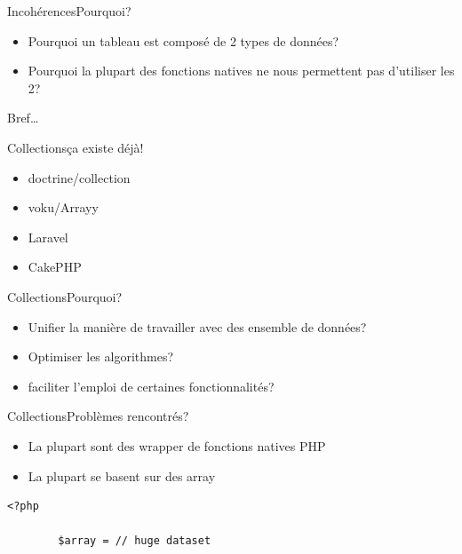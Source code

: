 \begin{frame}{Incohérences}{Pourquoi?}
    \begin{itemize}[<+->]
        \item Pourquoi un tableau est composé de 2 types de données?
        \item Pourquoi la plupart des fonctions natives ne nous permettent pas d'utiliser les 2?
    \end{itemize}
\end{frame}

\begin{frameC}{Bref\ldots}

\end{frameC}

\begin{frame}{Collections}{ça existe déjà!}
    \begin{itemize}[<+->]
        \item doctrine/collection
        \item voku/Arrayy
        \item Laravel
        \item CakePHP
    \end{itemize}
\end{frame}

\begin{frame}{Collections}{Pourquoi?}
    \begin{itemize}[<+->]
        \item Unifier la manière de travailler avec des ensemble de données?
        \item Optimiser les algorithmes?
        \item faciliter l'emploi de certaines fonctionnalités?
    \end{itemize}
\end{frame}

\begin{frame}{Collections}{Problèmes rencontrés?}
    \begin{itemize}[<+->]
        \item La plupart sont des wrapper de fonctions natives PHP
        \item La plupart se basent sur des array
    \end{itemize}
\end{frame}

\begin{frame}[fragile]
    \begin{lstlisting}[firstnumber=1]
        <?php

        $array = // huge dataset
    \end{lstlisting}
\end{frame}

